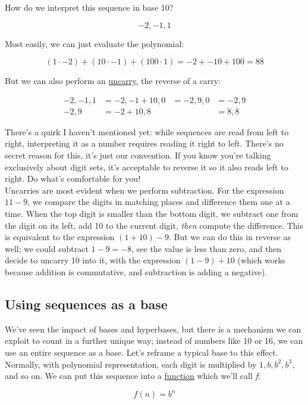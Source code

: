 \documentclass{article}
\begin{document}
How do we interpret this sequence in base 10?

$$-2, -1, 1$$

\noindent Most easily, we can just evaluate the polynomial:

$$(1 \cdot -2) + (10 \cdot -1) + (100 \cdot 1) = -2 + -10 + 100 = 88$$

\noindent But we can also perform an \underline{uncarry}, the reverse of a carry:

\begin{align*}
-2, -1, 1 &= -2, -1 + 10, 0 &= -2, 9, 0 &= -2, 9\\
-2, 9 &= -2 + 10, 8 &&= 8, 8
\end{align*}

\noindent There's a quirk I haven't mentioned yet: while sequences are read from left to right, interpreting it as a number requires reading it right to left. There's no secret reason for this, it's just our convention. If you know you're talking exclusively about digit sets, it's acceptable to reverse it so it also reads left to right. Do what's comfortable for you!\\

\noindent Uncarries are most evident when we perform subtraction. For the expression $11 - 9$, we compare the digits in matching places and difference them one at a time. When the top digit is smaller than the bottom digit, we subtract one from the digit on its left, add 10 to the current digit, \textit{then} compute the difference. This is  equivalent to the expression $(1 + 10) - 9$. But we can do this in reverse as well; we could subtract $1 - 9 = -8$, see the value is less than zero, and then decide to uncarry 10 into it, with the expression $(1 - 9) + 10$ (which works because addition is commutative, and subtraction is adding a negative).

\subsection*{Using sequences as a base}

We've seen the impact of bases and hyperbases, but there is a mechanism we can exploit to count in a further unique way; instead of numbers like 10 or 16, we can use an entire sequence as a base. Let's reframe a typical base to this effect. Normally, with polynomial representation, each digit is multiplied by $1, b, b^2, b^3,$ and so on. We can put this sequence into a \underline{function} which we'll call \textit{f}:

$$f(n) = b^n$$
\end{document}
